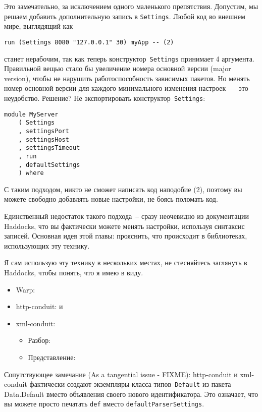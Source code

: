 Это замечательно, за исключением одного маленького
препятствия. Допустим, мы решаем добавить дополнительную запись в
\lstinline!Settings!. Любой код во внешнем мире, выглядящий как
\begin{lstlisting}
run (Settings 8080 "127.0.0.1" 30) myApp -- (2)
\end{lstlisting}
станет нерабочим, так как теперь конструктор~\lstinline!Settings!
принимает 4 аргумента. Правильной вещью стало бы увеличение номера
основной версии (major version), чтобы не нарушить работоспособность
зависимых пакетов. Но менять номер основной версии для каждого
минимального изменения настроек~--- это неудобство. Решение? Не
экспортировать конструктор~\lstinline!Settings!:
\begin{lstlisting}
module MyServer
    ( Settings
    , settingsPort
    , settingsHost
    , settingsTimeout
    , run
    , defaultSettings
    ) where
\end{lstlisting}

С таким подходом, никто не сможет написать код наподобие (2), поэтому
вы можете свободно добавлять новые настройки, не боясь поломать код.

Единственный недостаток такого подхода~-- сразу неочевидно из
документации Haddocks, что вы фактически можете менять настройки,
используя синтаксис записей. Основная идея этой главы: прояснить, что
происходит в библиотеках, использующих эту технику.

Я сам использую эту технику в нескольких местах, не стесняйтесь
заглянуть в Haddocks, чтобы понять, что я имею в виду.
\begin{itemize}
\item Warp: 
\item http-conduit: 
  и 
\item xml-conduit:
  \begin{itemize}
  \item Разбор: 
  \item Представление: 
  \end{itemize}
\end{itemize}

Сопутствующее замечание (As a tangential issue - FIXME): http-conduit
и xml-conduit фактически создают экземпляры класса
типов~\lstinline!Default! из пакета Data.Default вместо объявления
своего нового идентификатора. Это означает, что вы можете просто
печатать \lstinline!def! вместо \lstinline!defaultParserSettings!.
